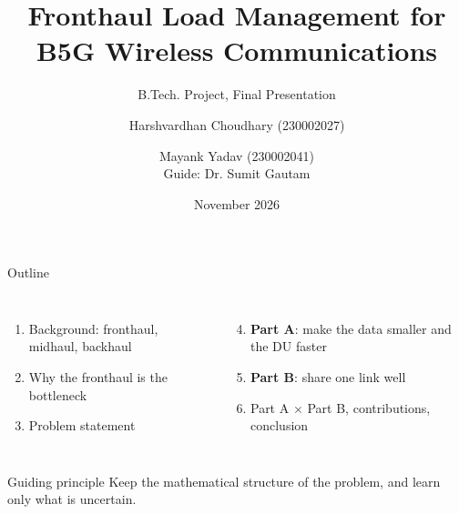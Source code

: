 \documentclass[aspectratio=169,11pt]{beamer}
\title[Fronthaul Load Management for B5G]{Fronthaul Load Management for B5G Wireless Communications}
\subtitle{B.Tech. Project, Final Presentation}
\author[H. Choudhary, M. Yadav]{Harshvardhan Choudhary (230002027) \and Mayank Yadav (230002041)\\[4pt]
  {\small Guide: Dr. Sumit Gautam}}
\institute[IIT Indore]{Department of Electrical Engineering\\Indian Institute of Technology Indore}
\date{November 2026}
\begin{document}
\begin{frame}
\titlepage
\end{frame}

\begin{frame}{Outline}
\begin{columns}[T]
\begin{enumerate}
  \item Background: fronthaul, midhaul, backhaul
  \item Why the fronthaul is the bottleneck
  \item Problem statement
\end{enumerate}
\begin{enumerate}\setcounter{enumi}{3}
  \item \textcolor{iitblue}{\textbf{Part A}}: make the data smaller and the DU faster
  \item \textcolor{accent}{\textbf{Part B}}: share one link well
  \item Part A $\times$ Part B, contributions, conclusion
\end{enumerate}
\end{columns}
\vspace{0.8cm}
\begin{block}{Guiding principle}
\centering Keep the mathematical structure of the problem, and learn only what is uncertain.
\end{block}
\end{frame}

\end{document}

